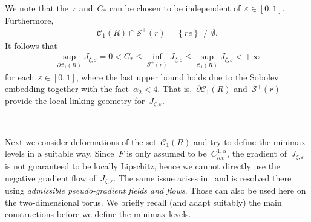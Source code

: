 \documentclass[10pt,a4paper]{amsart}
\newcommand{\p}{\partial}
\newcommand{\eps}{\varepsilon}
\newcommand{\braces}[1]{\left\{#1\right\}} %
\begin{document}
We note that the~$r$ and~$C_*$ can be chosen to be independent of~$\eps\in [0,1]$.
Furthermore,
\begin{align}\label{eq:intersection}
    \mathscr{C}_1(R)\cap \mathscr{S}^+(r)= \braces{ r e} \neq\emptyset.
\end{align}
It follows that
\begin{align}\label{eq:level estimate}
    \sup_{\p \mathscr{C}_1(R)} J_{\zeta,\eps} = 0 
    < C_* 
    \leq  \inf_{\mathscr{S}^+(r)} J_{\zeta,\eps} 
    \leq \sup_{\mathscr{C}_1(R)} J_{\zeta,\eps} <+\infty
\end{align}
for each~$\eps\in [0,1]$, where the last upper bound holds due to the Sobolev embedding together with the fact~$\alpha_2<4$.
That is,~$\p\mathscr{C}_1(R)$ and~$\mathscr{S}^+(r)$ provide the local linking geometry for~$J_{\zeta,\eps}$. 

\

Next we consider deformations of the set~$\mathscr{C}_1(R)$ and try to define the minimax levels in a suitable way. 
Since~$F$ is only assumed to be~$C^{1,\alpha}_{loc}$, the gradient of~$J_{\zeta,\eps}$ is not guaranteed to be locally Lipschitz, hence we cannot directly use the negative gradient flow of~$J_{\zeta,\eps}$. 
The same issue arises in~\cite{WZ2026Stationary} and is resolved there using \emph{admissible pseudo-gradient fields and flows}. 
Those can also be used here on the two-dimensional torus. 
We briefly recall (and adapt suitably) the main constructions before we define the minimax levels. 
\end{document}
